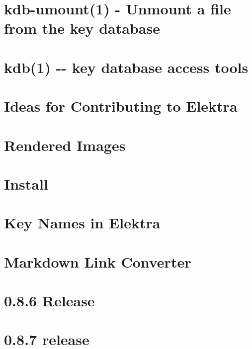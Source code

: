 \documentclass[twoside]{book}
\newcommand{\+}{\discretionary{\mbox{\scriptsize$\hookleftarrow$}}{}{}}
\begin{document}
\chapter{kdb-\/umount(1) -\/ Unmount a file from the key database}
\label{doc_help_kdb-umount_md}

\chapter{kdb(1) -\/-\/ key database access tools}
\label{doc_help_kdb_md}

\chapter{Ideas for Contributing to Elektra}
\label{doc_IDEAS_md}

\chapter{Rendered Images}
\label{doc_images_README_md}

\chapter{Install}
\label{doc_INSTALL_md}

\chapter{Key Names in Elektra}
\label{doc_KEYNAMES_md}

\chapter{Markdown Link Converter}
\label{doc_markdownlinkconverter_README_md}

\chapter{0.8.6 Release}
\label{doc_news_2014-06-21_0_8_6_md}

\chapter{0.8.7 release}
\label{doc_news_2014-07-28_0_8_7_md}

\end{document}
